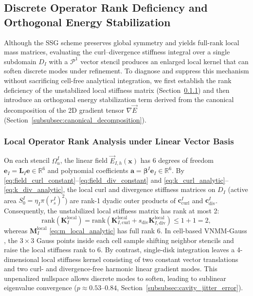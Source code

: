\documentclass[VANCOUVER,Times1COL]{WileyNJD-v5}
\begin{document}
\subsection{Discrete Operator Rank Deficiency and Orthogonal Energy Stabilization}
\label{subsec:rank_deficiency_stabilization}

Although the SSG scheme preserves global symmetry and yields full-rank local mass matrices, evaluating the curl--divergence stiffness integral over a single subdomain $D_I$ with a $\mathcal{P}^1$ vector stencil produces an enlarged local kernel that can soften discrete modes under refinement. To diagnose and suppress this mechanism without sacrificing cell-free analytical integration, we first establish the rank deficiency of the unstabilized local stiffness matrix (Section~\ref{subsubsec:local_rank_analysis}) and then introduce an orthogonal energy stabilization term derived from the canonical decomposition of the 2D gradient tensor $\nabla\vec{E}$ (Section~\ref{subsubsec:canonical_decomposition}).

\subsubsection{Local Operator Rank Analysis under Linear Vector Basis}
\label{subsubsec:local_rank_analysis}

On each stencil $\Omega_u^I$, the linear field $\vec{E}_{I,h}(\mathbf{x})$ has 6 degrees of freedom $\mathbf{e}_I = \mathbf{L}_I \mathbf{e} \in \mathbb{R}^6$ and polynomial coefficients $\mathbf{a} = \boldsymbol{\beta}^I \mathbf{e}_I \in \mathbb{R}^6$. By \eqref{eq:field_curl_constant}--\eqref{eq:field_div_constant} and \eqref{eq:k_curl_analytic}--\eqref{eq:k_div_analytic}, the local curl and divergence stiffness matrices on $D_I$ (active area $S_0^I = \eta_I \pi (r_s^I)^2$) are rank-1 dyadic outer products of $\mathbf{c}_{\mathrm{curl}}^I$ and $\mathbf{c}_{\mathrm{div}}^I$. Consequently, the unstabilized local stiffness matrix has rank at most 2:
\begin{equation}
    \mathrm{rank}(\mathbf{K}_I^{\mathrm{local}}) = \mathrm{rank}\left(\mathbf{K}_{I, \mathrm{curl}}^{\mathrm{local}} + s_{\mathrm{div}}\mathbf{K}_{I, \mathrm{div}}^{\mathrm{local}}\right) \le 1 + 1 = 2,
    \label{eq:stiffness_rank_deficiency}
\end{equation}
whereas $\mathbf{M}_I^{\mathrm{local}}$ \eqref{eq:m_local_analytic} has full rank 6. In cell-based VNMM-Gauss \cite{stable_vnmm2d_2026}, the $3 \times 3$ Gauss points inside each cell sample shifting neighbor stencils and raise the local stiffness rank to 6. By contrast, single-disk integration leaves a 4-dimensional local stiffness kernel consisting of two constant vector translations and two curl- and divergence-free harmonic linear gradient modes. This unpenalized nullspace allows discrete modes to soften, leading to sublinear eigenvalue convergence ($p \approx 0.53\text{--}0.84$, Section~\ref{subsubsec:cavity_jitter_error}).
\end{document}
